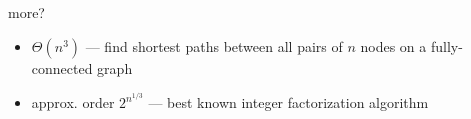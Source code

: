 \begin{frame}{more?}
    \begin{itemize}
    \item $\Theta(n^3)$ --- find shortest paths between all pairs of $n$ nodes on a fully-connected graph
    \item approx. order $2^{n^{1/3}}$ --- best known integer factorization algorithm
    \end{itemize}
\end{frame}
